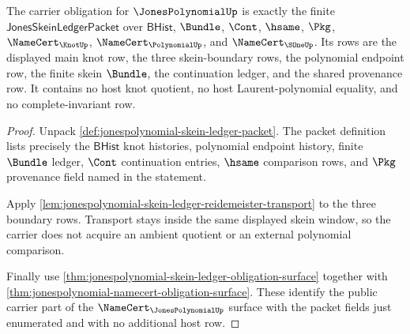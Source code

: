 \begin{theorem}
\label{thm:jonespolynomial-carrier-obligation}
The carrier obligation for $\JonesPolynomialUp$ is exactly the finite
$\mathsf{JonesSkeinLedgerPacket}$ over $\mathsf{BHist}$, $\Bundle$, $\Cont$,
$\hsame$, $\Pkg$, $\NameCert_{\KnotUp}$, $\NameCert_{\PolynomialUp}$, and
$\NameCert_{\SOneUp}$. Its rows are the displayed main knot row, the three
skein-boundary rows, the polynomial endpoint row, the finite skein $\Bundle$,
the continuation ledger, and the shared provenance row. It contains no host
knot quotient, no host Laurent-polynomial equality, and no complete-invariant
row.
\end{theorem}
\begin{proof}
Unpack \autoref{def:jonespolynomial-skein-ledger-packet}. The packet definition
lists precisely the $\mathsf{BHist}$ knot histories, polynomial endpoint
history, finite $\Bundle$ ledger, $\Cont$ continuation entries, $\hsame$
comparison rows, and $\Pkg$ provenance field named in the statement.

Apply
\autoref{lem:jonespolynomial-skein-ledger-reidemeister-transport} to the three
boundary rows. Transport stays inside the same displayed skein window, so the
carrier does not acquire an ambient quotient or an external polynomial
comparison.

Finally use
\autoref{thm:jonespolynomial-skein-ledger-obligation-surface} together with
\autoref{thm:jonespolynomial-namecert-obligation-surface}. These identify the
public carrier part of the $\NameCert_{\JonesPolynomialUp}$ surface with the
packet fields just enumerated and with no additional host row.
\end{proof}

